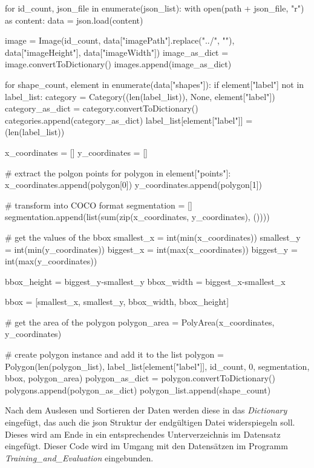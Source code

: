 \documentclass[a4paper,12pt,ngerman]{article}
\begin{document}
\begin{python}
for id_count, json_file in enumerate(json_list):
    with open(path + json_file, "r") as content:
        data = json.load(content)
        
        image = Image(id_count, data["imagePath"].replace("../", ""), data["imageHeight"], data["imageWidth"])
        image_as_dict = image.convertToDictionary()
        images.append(image_as_dict)

        for shape_count, element in enumerate(data["shapes"]):
            if element["label"] not in label_list:
                category = Category((len(label_list)), None, element["label"])
                category_as_dict = category.convertToDictionary()
                categories.append(category_as_dict)
                label_list[element["label"]] = (len(label_list))

            x_coordinates = []
            y_coordinates = []

            # extract the polgon points
            for polygon in element["points"]:
                x_coordinates.append(polygon[0])
                y_coordinates.append(polygon[1])

            # transform into COCO format
            segmentation = []
            segmentation.append(list(sum(zip(x_coordinates, y_coordinates), ())))

            # get the values of the bbox
            smallest_x = int(min(x_coordinates))
            smallest_y = int(min(y_coordinates))
            biggest_x = int(max(x_coordinates))
            biggest_y = int(max(y_coordinates))

            bbox_height = biggest_y-smallest_y
            bbox_width = biggest_x-smallest_x

            bbox = [smallest_x, smallest_y, bbox_width, bbox_height]

            # get the area of the polygon
            polygon_area = PolyArea(x_coordinates, y_coordinates)

            # create polygon instance and add it to the list
            polygon = Polygon(len(polygon_list), label_list[element["label"]], id_count, 0, segmentation, bbox, polygon_area)
            polygon_as_dict = polygon.convertToDictionary()
            polygons.append(polygon_as_dict)
            polygon_list.append(shape_count)
\end{python}

Nach dem Auslesen und Sortieren der Daten werden diese in das \textit{Dictionary} eingefügt, das auch die json Struktur der endgültigen Datei widerspiegeln soll. Dieses wird am Ende in ein entsprechendes Unterverzeichnis im Datensatz eingefügt. Dieser Code wird im Umgang mit den Datensätzen im Programm \textit{Training\_and\_Evaluation} eingebunden. \\
\end{document}
